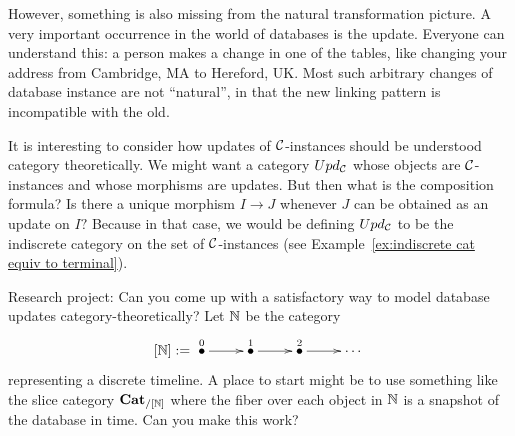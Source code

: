 \documentclass[../main/CT4S-EN-RU]{subfiles}
\begin{document}
\begin{blockRUS}
\end{blockRUS}

\begin{blockENG}
However, something is also missing from the natural transformation picture. A very important occurrence in the world of databases is the update. Everyone can understand this: a person makes a change in one of the tables, like changing your address from Cambridge, MA to Hereford, UK. Most such arbitrary changes of database instance are not “natural”, in that the new linking pattern is incompatible with the old.
\end{blockENG}

\begin{blockRUS}
\end{blockRUS}

\begin{blockENG}
It is interesting to consider how updates of $\mathcal{C}$-instances should be understood category theoretically. We might want a category $Upd_\mathcal{C}$ whose objects are $\mathcal{C}$-instances and whose morphisms are updates. But then what is the composition formula? Is there a unique morphism $I\to J$ whenever $J$ can be obtained as an update on $I?$ Because in that case, we would be defining $Upd_\mathcal{C}$ to be the indiscrete category on the set of $\mathcal{C}$-instances (see Example~\ref{ex:indiscrete cat equiv to terminal}).
\end{blockENG}

\begin{blockRUS}
\end{blockRUS}

\begin{exerciseENG}
Research project: Can you come up with a satisfactory way to model database updates category-theoretically? Let ${\mathbb N}$ be the category
$$[\NN]:=\xymatrix{\LMO{0}\ar[r]&\LMO{1}\ar[r]&\LMO{2}\ar[r]&\cdots}$$ 
representing a discrete timeline. A place to start might be to use something like the slice category ${\mathbf{Cat}}_{/[{\mathbb N}]}$ where the fiber over each object in ${\mathbb N}$ is a snapshot of the database in time. Can you make this work?
\end{exerciseENG}

\begin{exerciseRUS}
\end{exerciseRUS}


\subsection{}\label{sec:equivalence of cats}
\end{document}
